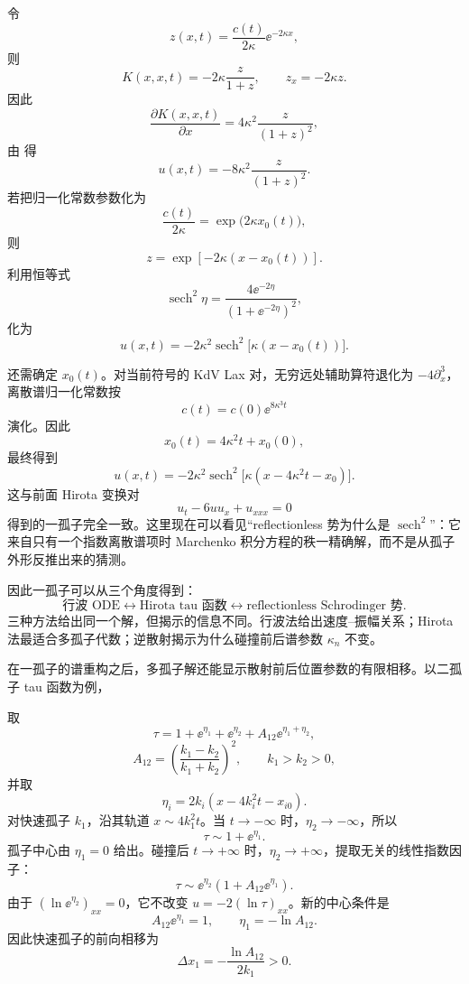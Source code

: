 令
\[
z(x,t)=\frac{c(t)}{2\kappa}\ee^{-2\kappa x},
\]
则
\[
K(x,x,t)=-2\kappa\frac{z}{1+z},
\qquad
z_x=-2\kappa z.
\]
因此
\[
\frac{\partial K(x,x,t)}{\partial x}
=4\kappa^2\frac{z}{(1+z)^2},
\]
由  得
\begin{equation}
 u(x,t)
=-8\kappa^2\frac{z}{(1+z)^2}.
\label{eq:ist-z-form}
\end{equation}
若把归一化常数参数化为
\[
\frac{c(t)}{2\kappa}
=\exp\bigl(2\kappa x_0(t)\bigr),
\]
则
\[
z=\exp[-2\kappa(x-x_0(t))].
\]
利用恒等式
\[
\operatorname{sech}^2\eta
=\frac{4\ee^{-2\eta}}{(1+\ee^{-2\eta})^2},
\]
 化为
\[
 u(x,t)
=-2\kappa^2
\operatorname{sech}^2\!\bigl[\kappa(x-x_0(t))\bigr].
\]

还需确定 $x_0(t)$。对当前符号的 KdV Lax 对，无穷远处辅助算符退化为 $-4\partial_x^3$，离散谱归一化常数按
\[
c(t)=c(0)\ee^{8\kappa^3t}
\]
演化。因此
\[
 x_0(t)=4\kappa^2t+x_0(0),
\]
最终得到
\begin{equation*}\boxed{
 u(x,t)
=-2\kappa^2
\operatorname{sech}^2
\bigl[\kappa(x-4\kappa^2t-x_0)\bigr]
}.\end{equation*}
这与前面 Hirota 变换对
\[
 u_t-6u u_x+u_{xxx}=0
\]
得到的一孤子完全一致。这里现在可以看见“reflectionless 势为什么是 $\operatorname{sech}^2$”：它来自只有一个指数离散谱项时 Marchenko 积分方程的秩一精确解，而不是从孤子外形反推出来的猜测。

因此一孤子可以从三个角度得到：
\[
\text{行波 ODE}
\longleftrightarrow
\text{Hirota tau 函数}
\longleftrightarrow
\text{reflectionless Schrodinger 势}.
\]
三种方法给出同一个解，但揭示的信息不同。行波法给出速度--振幅关系；Hirota 法最适合多孤子代数；逆散射揭示为什么碰撞前后谱参数 $\kappa_n$ 不变。

在一孤子的谱重构之后，多孤子解还能显示散射前后位置参数的有限相移。以二孤子 tau 函数为例，

取
\[
\tau=1+\ee^{\eta_1}+\ee^{\eta_2}
+A_{12}\ee^{\eta_1+\eta_2},
\]
\[
A_{12}=
\left(\frac{k_1-k_2}{k_1+k_2}\right)^2,
\qquad k_1>k_2>0,
\]
并取
\[
\eta_i=2k_i(x-4k_i^2t-x_{i0}).
\]
对快速孤子 $k_1$，沿其轨道 $x\sim4k_1^2t$。当 $t\to-\infty$ 时，$\eta_2\to-\infty$，所以
\[
\tau\sim1+\ee^{\eta_1}.
\]
孤子中心由 $\eta_1=0$ 给出。碰撞后 $t\to+\infty$ 时，$\eta_2\to+\infty$，提取无关的线性指数因子：
\[
\tau\sim \ee^{\eta_2}
\left(1+A_{12}\ee^{\eta_1}\right).
\]
由于 $(\ln \ee^{\eta_2})_{xx}=0$，它不改变 $u=-2(\ln\tau)_{xx}$。新的中心条件是
\[
A_{12}\ee^{\eta_1}=1,
\qquad
\eta_1=-\ln A_{12}.
\]
因此快速孤子的前向相移为
\begin{equation*}\boxed{
\Delta x_1
=-\frac{\ln A_{12}}{2k_1}>0
}.\end{equation*}

